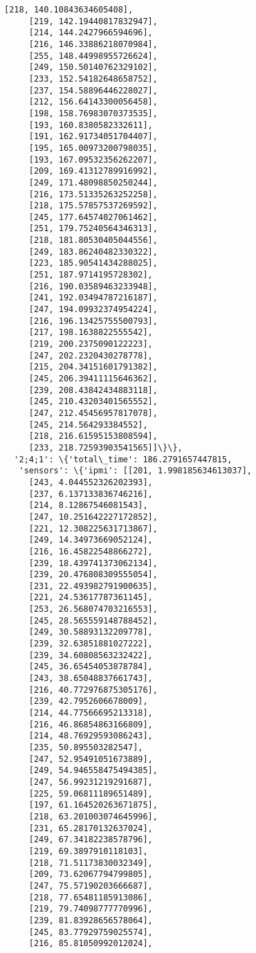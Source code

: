 \documentclass[11pt]{article}
\begin{document}
\begin{tcolorbox}[breakable, size=fbox, boxrule=.5pt, pad at break*=1mm, opacityfill=0]
\begin{Verbatim}[commandchars=\\\{\}]
     [218, 140.10843634605408],
     [219, 142.19440817832947],
     [214, 144.2427966594696],
     [216, 146.33886218070984],
     [255, 148.44998955726624],
     [249, 150.50140762329102],
     [233, 152.54182648658752],
     [237, 154.58896446228027],
     [212, 156.64143300056458],
     [198, 158.76983070373535],
     [193, 160.8380582332611],
     [191, 162.91734051704407],
     [195, 165.00973200798035],
     [193, 167.09532356262207],
     [209, 169.41312789916992],
     [249, 171.48098850250244],
     [216, 173.51335263252258],
     [218, 175.57857537269592],
     [245, 177.64574027061462],
     [251, 179.75240564346313],
     [218, 181.80530405044556],
     [249, 183.86240482330322],
     [223, 185.90541434288025],
     [251, 187.9714195728302],
     [216, 190.03589463233948],
     [241, 192.03494787216187],
     [247, 194.09932374954224],
     [216, 196.13425755500793],
     [217, 198.1638822555542],
     [219, 200.2375090122223],
     [247, 202.2320430278778],
     [215, 204.34151601791382],
     [245, 206.39411115646362],
     [239, 208.43842434883118],
     [245, 210.43203401565552],
     [247, 212.45456957817078],
     [245, 214.564293384552],
     [218, 216.61595153808594],
     [233, 218.72593903541565]]\}\},
  '2;4;1': \{'total\_time': 186.2791657447815,
   'sensors': \{'ipmi': [[201, 1.998185634613037],
     [243, 4.044552326202393],
     [237, 6.137133836746216],
     [214, 8.12867546081543],
     [247, 10.251642227172852],
     [221, 12.308225631713867],
     [249, 14.34973669052124],
     [216, 16.45822548866272],
     [239, 18.439741373062134],
     [239, 20.476808309555054],
     [231, 22.493982791900635],
     [221, 24.53617787361145],
     [253, 26.568074703216553],
     [245, 28.565559148788452],
     [249, 30.58893132209778],
     [239, 32.63851881027222],
     [239, 34.60808563232422],
     [245, 36.65454053878784],
     [243, 38.65048837661743],
     [216, 40.772976875305176],
     [239, 42.7952606678009],
     [214, 44.77566695213318],
     [216, 46.86854863166809],
     [214, 48.76929593086243],
     [235, 50.895503282547],
     [247, 52.95491051673889],
     [249, 54.946558475494385],
     [247, 56.99231219291687],
     [225, 59.06811189651489],
     [197, 61.164520263671875],
     [218, 63.201003074645996],
     [231, 65.28170132637024],
     [249, 67.34182238578796],
     [219, 69.3897910118103],
     [218, 71.51173830032349],
     [209, 73.62067794799805],
     [247, 75.57190203666687],
     [218, 77.65481185913086],
     [219, 79.74098777770996],
     [239, 81.83928656578064],
     [245, 83.77929759025574],
     [216, 85.81050992012024],

\end{Verbatim}
\end{tcolorbox}
\end{document}
